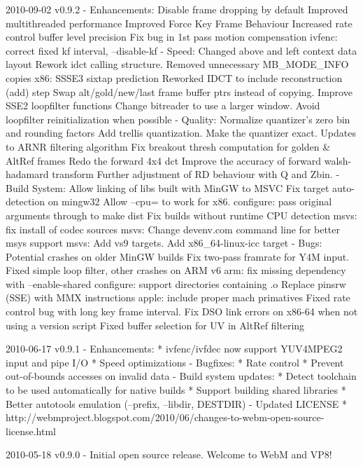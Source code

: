 \begin{DoxyVerbInclude}
2010-09-02 v0.9.2
  - Enhancements:
      Disable frame dropping by default
      Improved multithreaded performance
      Improved Force Key Frame Behaviour
      Increased rate control buffer level precision
      Fix bug in 1st pass motion compensation
      ivfenc: correct fixed kf interval, --disable-kf
  - Speed:
      Changed above and left context data layout
      Rework idct calling structure.
      Removed unnecessary MB_MODE_INFO copies
      x86: SSSE3 sixtap prediction
      Reworked IDCT to include reconstruction (add) step
      Swap alt/gold/new/last frame buffer ptrs instead of copying.
      Improve SSE2 loopfilter functions
      Change bitreader to use a larger window.
      Avoid loopfilter reinitialization when possible
  - Quality:
      Normalize quantizer's zero bin and rounding factors
      Add trellis quantization.
      Make the quantizer exact.
      Updates to ARNR filtering algorithm
      Fix breakout thresh computation for golden & AltRef frames
      Redo the forward 4x4 dct
      Improve the accuracy of forward walsh-hadamard transform
      Further adjustment of RD behaviour with Q and Zbin.
  - Build System:
      Allow linking of libs built with MinGW to MSVC
      Fix target auto-detection on mingw32
      Allow --cpu= to work for x86.
      configure: pass original arguments through to make dist
      Fix builds without runtime CPU detection
      msvs: fix install of codec sources
      msvs: Change devenv.com command line for better msys support
      msvs: Add vs9 targets.
      Add x86_64-linux-icc target
  - Bugs:
      Potential crashes on older MinGW builds
      Fix two-pass framrate for Y4M input.
      Fixed simple loop filter, other crashes on ARM v6
      arm: fix missing dependency with --enable-shared
      configure: support directories containing .o
      Replace pinsrw (SSE) with MMX instructions
      apple: include proper mach primatives
      Fixed rate control bug with long key frame interval.
      Fix DSO link errors on x86-64 when not using a version script
      Fixed buffer selection for UV in AltRef filtering


2010-06-17 v0.9.1
  - Enhancements:
      * ivfenc/ivfdec now support YUV4MPEG2 input and pipe I/O
      * Speed optimizations
  - Bugfixes:
      * Rate control
      * Prevent out-of-bounds accesses on invalid data
  - Build system updates:
      * Detect toolchain to be used automatically for native builds
      * Support building shared libraries
      * Better autotools emulation (--prefix, --libdir, DESTDIR)
  - Updated LICENSE
      * http://webmproject.blogspot.com/2010/06/changes-to-webm-open-source-license.html


2010-05-18 v0.9.0
  - Initial open source release. Welcome to WebM and VP8!

\end{DoxyVerbInclude}
 
